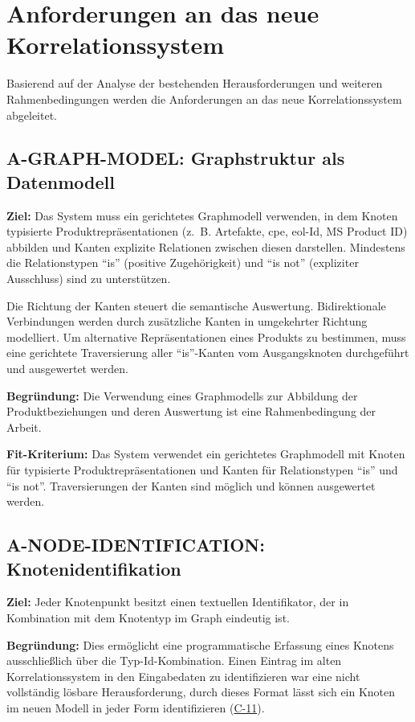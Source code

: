 \section{Anforderungen an das neue Korrelationssystem}\label{sec:requirements}

Basierend auf der Analyse der bestehenden Herausforderungen und weiteren Rahmenbedingungen werden die Anforderungen an das neue Korrelationssystem abgeleitet.

\subsection{A-GRAPH-MODEL: Graphstruktur als Datenmodell}\label{subsec:req-format-product-graph}

\textbf{Ziel:}
Das System muss ein gerichtetes Graphmodell verwenden, in dem Knoten typisierte Produktrepräsentationen (z.\ B. Artefakte, \acrshort{cpe}, \acrshort{eol}-Id, MS Product ID) abbilden und Kanten explizite Relationen zwischen diesen darstellen.
Mindestens die Relationstypen \enquote{is} (positive Zugehörigkeit) und \enquote{is not} (expliziter Ausschluss) sind zu unterstützen.

Die Richtung der Kanten steuert die semantische Auswertung.
Bidirektionale Verbindungen werden durch zusätzliche Kanten in umgekehrter Richtung modelliert.
Um alternative Repräsentationen eines Produkts zu bestimmen, muss eine gerichtete Traversierung aller \enquote{is}-Kanten vom Ausgangsknoten durchgeführt und ausgewertet werden.

\textbf{Begründung:}
Die Verwendung eines Graphmodells zur Abbildung der Produktbeziehungen und deren Auswertung ist eine Rahmenbedingung der Arbeit.

\textbf{Fit-Kriterium:}
Das System verwendet ein gerichtetes Graphmodell mit Knoten für typisierte Produktrepräsentationen und Kanten für Relationstypen \enquote{is} und \enquote{is not}.
Traversierungen der Kanten sind möglich und können ausgewertet werden.

\subsection{A-NODE-IDENTIFICATION: Knotenidentifikation}\label{subsec:req-node-id-type}

\textbf{Ziel:}
Jeder Knotenpunkt besitzt einen textuellen Identifikator, der in Kombination mit dem Knotentyp im Graph eindeutig ist.

\textbf{Begründung:}
Dies ermöglicht eine programmatische Erfassung eines Knotens ausschließlich über die Typ-Id-Kombination.
Einen Eintrag im alten Korrelationssystem in den Eingabedaten zu identifizieren war eine nicht vollständig lösbare Herausforderung, durch dieses Format lässt sich ein Knoten im neuen Modell in jeder Form identifizieren (\hyperref[subsec:c-11-finding-yaml-entries]{C-11}).

